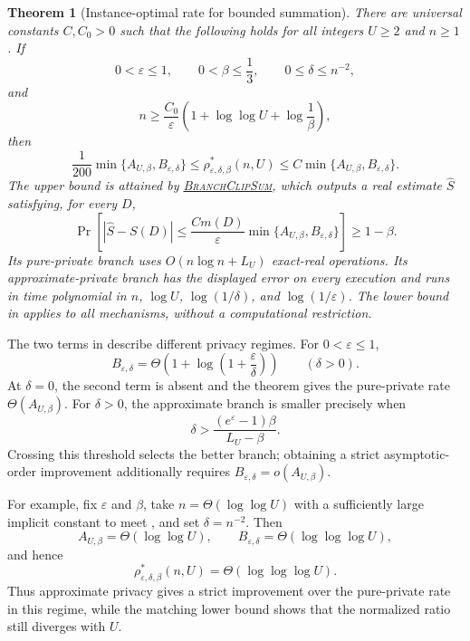 \documentclass[11pt]{article}
\newtheorem{theorem}{Theorem}[section]
\begin{document}
\begin{theorem}[Instance-optimal rate for bounded summation]
\label{thm:main}
There are universal constants $C,C_0>0$ such that the following holds for
all integers $U\ge2$ and $n\ge1$.  If
\[
 0<\varepsilon\le1,
 \qquad 0<\beta\le\frac13,
 \qquad 0\le\delta\le n^{-2},
\]
and
\begin{equation}
 n\ge\frac{C_0}{\varepsilon}
 \left(1+\log\log U+\log\frac1\beta\right),
 \label{eq:sample-hypothesis}
\end{equation}
then
\begin{equation}
 \frac1{200}\min\{A_{U,\beta},B_{\varepsilon,\delta}\}
 \le
 \rho^*_{\varepsilon,\delta,\beta}(n,U)
 \le
 C\min\{A_{U,\beta},B_{\varepsilon,\delta}\}.
 \label{eq:main-rate}
\end{equation}
The upper bound is attained by
\hyperref[alg:branch-clip-sum]{\textsc{BranchClipSum}}, which outputs a real
estimate $\widehat S$ satisfying, for every $D$,
\[
 \Pr\left[
  |\widehat S-S(D)|
  \le \frac{C m(D)}{\varepsilon}
  \min\{A_{U,\beta},B_{\varepsilon,\delta}\}
 \right]\ge1-\beta.
\]
Its pure-private branch uses $O(n\log n+L_U)$ exact-real operations.  Its
approximate-private branch has the displayed error on every execution and
runs in time polynomial in $n$, $\log U$, $\log(1/\delta)$, and
$\log(1/\varepsilon)$.  The lower bound in  applies to
all mechanisms, without a computational restriction.
\end{theorem}

The two terms in  describe different privacy regimes.
For $0<\varepsilon\le1$,
\[
 B_{\varepsilon,\delta}
 =\Theta\left(1+\log\left(1+\frac{\varepsilon}{\delta}\right)\right)
 \qquad(\delta>0).
\]
At $\delta=0$, the second term is absent and the theorem gives the
pure-private rate $\Theta(A_{U,\beta})$.  For $\delta>0$, the approximate
branch is smaller precisely when
\begin{equation}
 \delta>
 \frac{(e^\varepsilon-1)\beta}{L_U-\beta}.
 \label{eq:intro-crossover}
\end{equation}
Crossing this threshold selects the better branch; obtaining a strict
asymptotic-order improvement additionally requires
$B_{\varepsilon,\delta}=o(A_{U,\beta})$.

For example, fix $\varepsilon$ and $\beta$, take
$n=\Theta(\log\log U)$ with a sufficiently large implicit constant to meet
, and set $\delta=n^{-2}$.  Then
\[
 A_{U,\beta}=\Theta(\log\log U),
 \qquad
 B_{\varepsilon,\delta}=\Theta(\log\log\log U),
\]
and hence
\[
 \rho^*_{\varepsilon,\delta,\beta}(n,U)
 =\Theta(\log\log\log U).
\]
Thus approximate privacy gives a strict improvement over the pure-private
rate in this regime, while the matching lower bound shows that the normalized
ratio still diverges with $U$.
\end{document}
